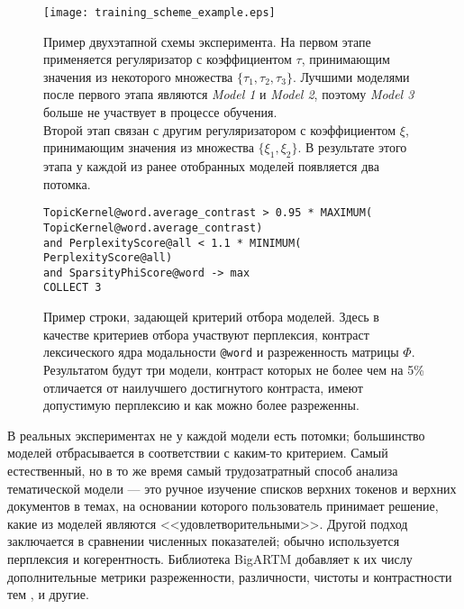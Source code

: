 \begin{figure}[ht]
    \centering
    \captionsetup{justification=raggedright,singlelinecheck=false,format=hang}

    \texttt{[image: training\_scheme\_example.eps]}

    \caption{
        Пример двухэтапной схемы эксперимента.
        На первом этапе применяется регуляризатор с коэффициентом $\tau$, принимающим значения из некоторого множества $\{\tau_1, \tau_2, \tau_3\}$.
        Лучшими моделями после первого этапа являются \emph{Model 1} и \emph{Model 2}, поэтому \emph{Model 3} больше не участвует в процессе обучения.\\
        Второй этап связан с другим регуляризатором с коэффициентом $\xi$, принимающим значения из множества $\{\xi_1, \xi_2\}$.
        В результате этого этапа у каждой из ранее отобранных моделей  появляется два потомка.
    }
\label{Training-scheme}
\end{figure} 


\begin{figure*}[ht]
\captionsetup{justification=raggedright,singlelinecheck=false,format=hang}
\texttt{TopicKernel@word.average\_contrast > 0.95 * MAXIMUM( \\
\hphantom{\ \ \ \ \ \ \ \ }TopicKernel@word.average\_contrast) \\
\hphantom{\ \ } and PerplexityScore@all < 1.1 * MINIMUM( \\
\hphantom{\ \ \ \ \ \ \ \ }PerplexityScore@all) \\
\hphantom{\ \ } and SparsityPhiScore@word -> max\\
\hphantom{\ \ } COLLECT 3} \\
\caption{Пример строки, задающей критерий отбора моделей. Здесь в качестве критериев отбора участвуют перплексия, контраст лексического ядра модальности \texttt{@word} и разреженность матрицы $\Phi$. Результатом будут три модели, контраст которых не более чем на 5\% отличается от наилучшего достигнутого контраста, имеют допустимую перплексию и как можно более разреженны. }
\label{DSL-example}
\end{figure*} 

В реальных экспериментах не у каждой модели есть потомки; большинство моделей отбрасывается в соответствии с каким-то критерием. Самый естественный, но в то же время самый трудозатратный способ анализа тематической модели --- это ручное изучение списков верхних токенов и верхних документов в темах, на основании которого пользователь принимает решение, какие из моделей являются <<удовлетворительными>>. Другой подход заключается в сравнении численных показателей; обычно используется перплексия и когерентность. Библиотека \mbox{BigARTM} добавляет к их числу дополнительные метрики разреженности, различности, чистоты и контрастности тем \cite{voron15mlj}, и другие.

